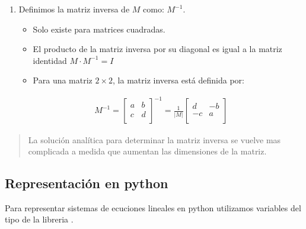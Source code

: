 \documentclass[letterpaper,10pt,english]{jupyterBook}
\begin{document}
\begin{enumerate}
%
\item {} 
\sphinxAtStartPar
{} Definimos la matriz inversa de \(M\) como: \(M^{-1}\).
\begin{itemize}
\item {} 
\sphinxAtStartPar
Solo existe para matrices cuadradas.

\item {} 
\sphinxAtStartPar
El producto de la matriz inversa por su diagonal es igual a la matriz identidad \(M\cdot M^{-1} = I\)

\item {} 
\sphinxAtStartPar
Para una matriz \(2\times2\), la matriz inversa está definida por:

\end{itemize}
\begin{equation*}
\begin{split}
M^{-1} = \begin{bmatrix}
a & b \\
c & d\\
\end{bmatrix}^{-1} = \frac{1}{|M|}\begin{bmatrix}
d & -b \\
-c & a\\
\end{bmatrix}\end{split}
\end{equation*}
\end{enumerate}
\begin{quote}

\sphinxAtStartPar
La solución analítica para determinar la matriz inversa se vuelve mas complicada a medida que aumentan las dimensiones de la matriz.
\end{quote}


\subsection{Representación en python}
\label{\detokenize{1.2-Algebra_lineal/1.2-Algebra_lineal:representacion-en-python}}
\sphinxAtStartPar
Para representar sistemas de ecuciones lineales en python utilizamos variables del tipo  de la libreria .
\end{document}
